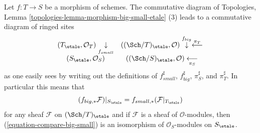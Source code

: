 Let $f : T \to S$ be a morphism of schemes. The commutative diagram of
Topologies, Lemma \ref{topologies-lemma-morphism-big-small-etale} (3)
leads to a commutative diagram of ringed sites
$$
\begin{array}{cc}(T_\etale, \mathcal{O}_T) \underset{f_{small}}{\downarrow} & ((\Sch/T)_\etale, \mathcal{O}) \overset{f_{big}}{\downarrow}\overset{\pi_T}{\longleftarrow} \\ (S_\etale, \mathcal{O}_S) & ((\Sch/S)_\etale, \mathcal{O}) \underset{\pi_S}{\longleftarrow}\end{array}
$$
as one easily sees by writing out the definitions of
$f_{small}^\sharp$, $f_{big}^\sharp$, $\pi_S^\sharp$, and $\pi_T^\sharp$.
In particular this means that
\begin{equation}
\label{equation-compare-big-small}
(f_{big, *}\mathcal{F})|_{S_\etale} =
f_{small, *}(\mathcal{F}|_{T_\etale})
\end{equation}
for any sheaf $\mathcal{F}$ on $(\Sch/T)_\etale$ and if $\mathcal{F}$
is a sheaf of $\mathcal{O}$-modules, then (\ref{equation-compare-big-small})
is an isomorphism of $\mathcal{O}_S$-modules on $S_\etale$.

